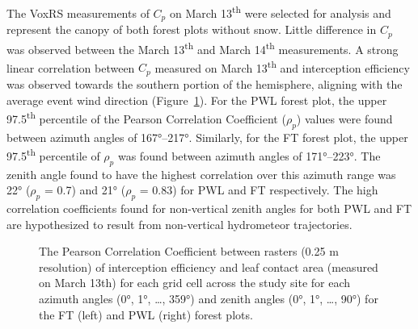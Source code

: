 \documentclass[
  letterpaper,
  DIV=11,
  numbers=noendperiod]{scrartcl}
\begin{document}
The VoxRS measurements of \(C_p\) on March 13\textsuperscript{th} were
selected for analysis and represent the canopy of both forest plots
without snow. Little difference in \(C_p\) was observed between the
March 13\textsuperscript{th} and March 14\textsuperscript{th}
measurements. A strong linear correlation between \(C_p\) measured on
March 13\textsuperscript{th} and interception efficiency was observed
towards the southern portion of the hemisphere, aligning with the
average event wind direction (Figure~\ref{fig-hemi-ip-cc}). For the PWL
forest plot, the upper 97.5\textsuperscript{th} percentile of the
Pearson Correlation Coefficient (\(\rho_p\)) values were found between
azimuth angles of 167°--217°. Similarly, for the FT forest plot, the
upper 97.5\textsuperscript{th} percentile of \(\rho_p\) was found
between azimuth angles of 171°--223°. The zenith angle found to have the
highest correlation over this azimuth range was 22° (\(\rho_p\) = 0.7)
and 21° (\(\rho_p\) = 0.83) for PWL and FT respectively. The high
correlation coefficients found for non-vertical zenith angles for both
PWL and FT are hypothesized to result from non-vertical hydrometeor
trajectories.

\begin{figure}[H]


\caption{\label{fig-hemi-ip-cc}The Pearson Correlation Coefficient
between rasters (0.25 m resolution) of interception efficiency and leaf
contact area (measured on March 13th) for each grid cell across the
study site for each azimuth angles (0°, 1°, \ldots, 359°) and zenith
angles (0°, 1°, \ldots, 90°) for the FT (left) and PWL (right) forest
plots.}

\end{figure}%
\end{document}
